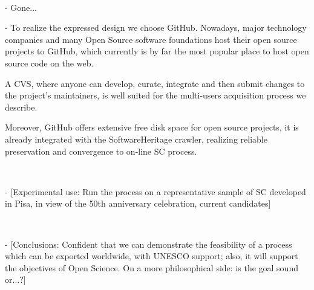 \documentclass[a4paper]{article}
\begin{document}
\

 - Gone...
\

 - To realize the expressed design we choose GitHub. Nowadays, major technology companies and many Open Source software foundations host their open source projects to GitHub, which currently is by far the most popular place to host open source code on the web.

A CVS, where anyone can develop, curate, integrate and then submit changes to the project's maintainers, is well suited for the multi-users acquisition process we describe.

Moreover, GitHub offers extensive free disk space for open source projects, it is already integrated with the SoftwareHeritage crawler, realizing reliable preservation and convergence to on-line SC process.

\

 - [Experimental use: Run the process on a representative sample of SC developed in Pisa, in view of the 50th anniversary celebration, current candidates]

\

 - [Conclusions: Confident that we can demonstrate the feasibility of a process which can be exported worldwide, with UNESCO support; also, it will support the objectives of Open Science. On a more philosophical side: is the goal sound or...?] 

\


\nocite{*}
\printbibliography



	
	
\end{document}
